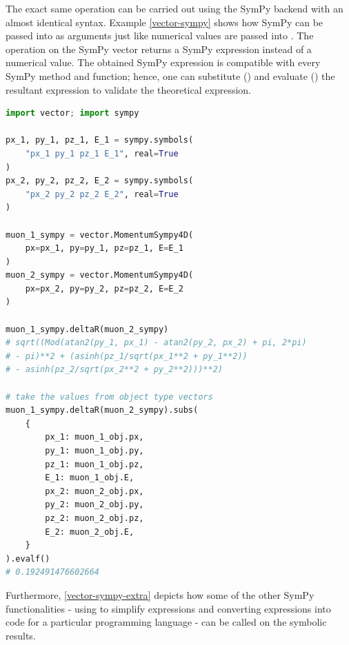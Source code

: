 \documentclass{webofc}
\begin{document}
The exact same operation can be carried out using the SymPy backend with an almost identical syntax. Example \ref{vector-sympy} shows how SymPy  can be passed into  as arguments just like numerical values are passed into . The  operation on the SymPy vector returns a SymPy expression instead of a numerical value. The obtained SymPy expression is compatible with every SymPy method and function; hence, one can substitute () and evaluate () the resultant expression to validate the theoretical expression.

\begin{lstlisting}[language=Python,mathescape=true,caption={Performing deltaR on SymPy vectors.},captionpos=b, label={vector-sympy}]
import vector; import sympy

px_1, py_1, pz_1, E_1 = sympy.symbols(
    "px_1 py_1 pz_1 E_1", real=True
)
px_2, py_2, pz_2, E_2 = sympy.symbols(
    "px_2 py_2 pz_2 E_2", real=True
)

muon_1_sympy = vector.MomentumSympy4D(
    px=px_1, py=py_1, pz=pz_1, E=E_1
)
muon_2_sympy = vector.MomentumSympy4D(
    px=px_2, py=py_2, pz=pz_2, E=E_2
)

muon_1_sympy.deltaR(muon_2_sympy)
# sqrt((Mod(atan2(py_1, px_1) - atan2(py_2, px_2) + pi, 2*pi)
# - pi)**2 + (asinh(pz_1/sqrt(px_1**2 + py_1**2))
# - asinh(pz_2/sqrt(px_2**2 + py_2**2)))**2)

# take the values from object type vectors
muon_1_sympy.deltaR(muon_2_sympy).subs(
    {
        px_1: muon_1_obj.px,
        py_1: muon_1_obj.py,
        pz_1: muon_1_obj.pz,
        E_1: muon_1_obj.E,
        px_2: muon_2_obj.px,
        py_2: muon_2_obj.py,
        pz_2: muon_2_obj.pz,
        E_2: muon_2_obj.E,
    }
).evalf()
# 0.192491476602664
\end{lstlisting}

Furthermore, \ref{vector-sympy-extra} depicts how some of the other SymPy functionalities - using  to simplify expressions and converting expressions into code for a particular programming language - can be called on the symbolic results.
\end{document}
